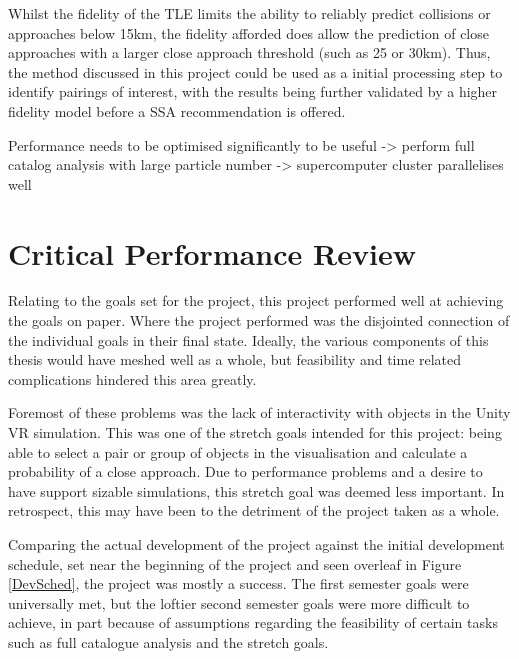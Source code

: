 \documentclass[12pt,openany,a4paper]{book}
\begin{document}
	Whilst the fidelity of the TLE limits the ability to reliably predict collisions or approaches below 15km, the fidelity afforded does allow the prediction of close approaches with a larger close approach threshold (such as 25 or 30km). Thus, the method discussed in this project could be used as a initial processing step to identify pairings of interest, with the results being further validated by a higher fidelity model before a SSA recommendation is offered. \newline
	

	
	Performance needs to be optimised significantly to be useful -> perform full catalog analysis with large particle number -> supercomputer cluster parallelises well

	
	\section{Critical Performance Review}
	
	Relating to the goals set for the project, this project performed well at achieving the goals on paper. Where the project performed was the disjointed connection of the individual goals in their final state. Ideally, the various components of this thesis would have meshed well as a whole, but feasibility and time related complications hindered this area greatly. \newline
	
	Foremost of these problems was the lack of interactivity with objects in the Unity VR simulation. This was one of the stretch goals intended for this project: being able to select a pair or group of objects in the visualisation and calculate a probability of a close approach. Due to performance problems and a desire to have support sizable simulations, this stretch goal was deemed less important. In retrospect, this may have been to the detriment of the project taken as a whole.
	
	Comparing the actual development of the project against the initial development schedule, set near the beginning of the project and seen overleaf in Figure \ref{DevSched}, the project was mostly a success. The first semester goals were universally met, but the loftier second semester goals were more difficult to achieve, in part because of assumptions regarding the feasibility of certain tasks such as full catalogue analysis and the stretch goals. \newline
	
\end{document}
